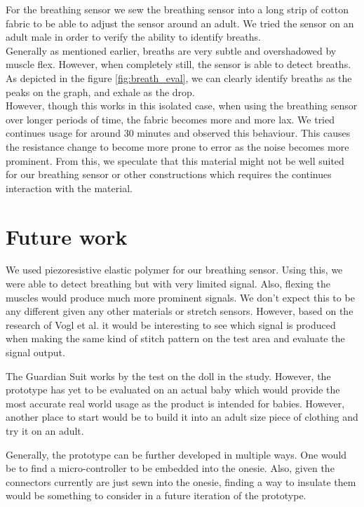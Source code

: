 \documentclass{sigchi-ext}
\begin{document}
For the breathing sensor we sew the breathing sensor into
a long strip of cotton fabric to be able to adjust the 
sensor around an adult. We tried the sensor on an 
adult male in order to verify the ability to identify 
breaths.\\
Generally as mentioned earlier, breaths are very subtle and
overshadowed by muscle flex. However, when completely still,
the sensor is able to detect breaths. As depicted in the figure \ref{fig:breath_eval},
we can clearly identify breaths as the peaks on the graph, and exhale as
the drop.\\
However, though this works in this isolated case, when using the breathing sensor
over longer periods of time, the fabric becomes more and more lax. We 
tried continues usage for around 30 minutes and observed this behaviour. This causes the resistance
change to become more prone to error as the noise becomes more prominent. From this, we speculate
that this material might not be well suited for our breathing sensor or other constructions which
requires the continues interaction with the material.

\section{Future work}
We used piezoresistive elastic polymer for our breathing sensor. Using this,
we were able to detect breathing but with very limited signal. Also, flexing the muscles
would produce much more prominent signals. We don't expect this to be any
different given any other materials or stretch sensors. However,
based on the research of Vogl et al. \cite{stretcheband} it would be interesting
to see which signal is produced when making the same kind of stitch pattern on
the test area and evaluate the signal output.

The Guardian Suit works by the test on the doll in the study. However,
the prototype has yet to be evaluated on an actual baby which would provide the
most accurate real world usage as the product is intended for babies. However,
another place to start would be to build it into an adult size piece of clothing
and try it on an adult.

Generally, the prototype can be further developed in multiple ways. One would be to 
find a micro-controller to be embedded into the onesie. Also, given the connectors currently are just
sewn into the onesie, finding a way to insulate them would be something to consider in a future
iteration of the prototype.
\end{document}
